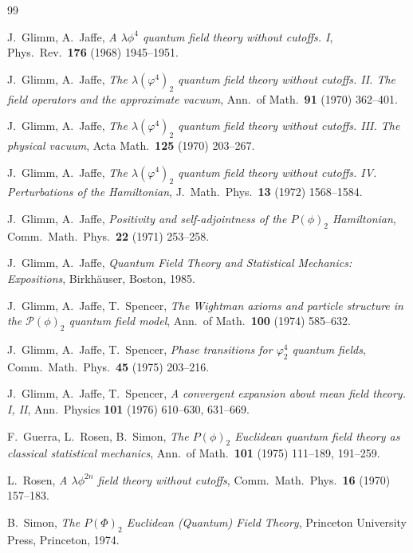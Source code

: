 \documentclass[11pt,a4paper]{article}
\theoremstyle{plain}
\theoremstyle{definition}
\theoremstyle{plain}
\theoremstyle{definition}
\begin{document}
\begin{thebibliography}{99}

 J.~Glimm, A.~Jaffe,
\emph{A $\lambda\phi^4$ quantum field theory without cutoffs. I},
Phys.\ Rev.\ \textbf{176} (1968) 1945--1951.

 J.~Glimm, A.~Jaffe,
\emph{The $\lambda(\varphi^4)_2$ quantum field theory without cutoffs. II. The field
operators and the approximate vacuum},
Ann.\ of Math.\ \textbf{91} (1970) 362--401.

 J.~Glimm, A.~Jaffe,
\emph{The $\lambda(\varphi^4)_2$ quantum field theory without cutoffs. III. The physical
vacuum},
Acta Math.\ \textbf{125} (1970) 203--267.

 J.~Glimm, A.~Jaffe,
\emph{The $\lambda(\varphi^4)_2$ quantum field theory without cutoffs. IV. Perturbations of
the Hamiltonian},
J.\ Math.\ Phys.\ \textbf{13} (1972) 1568--1584.

 J.~Glimm, A.~Jaffe,
\emph{Positivity and self-adjointness of the $P(\phi)_2$ Hamiltonian},
Comm.\ Math.\ Phys.\ \textbf{22} (1971) 253--258.

 J.~Glimm, A.~Jaffe,
\emph{Quantum Field Theory and Statistical Mechanics: Expositions},
Birkh\"auser, Boston, 1985.

 J.~Glimm, A.~Jaffe, T.~Spencer,
\emph{The Wightman axioms and particle structure in the $\mathscr P(\phi)_2$ quantum field
model},
Ann.\ of Math.\ \textbf{100} (1974) 585--632.

 J.~Glimm, A.~Jaffe, T.~Spencer,
\emph{Phase transitions for $\varphi^4_2$ quantum fields},
Comm.\ Math.\ Phys.\ \textbf{45} (1975) 203--216.

 J.~Glimm, A.~Jaffe, T.~Spencer,
\emph{A convergent expansion about mean field theory. I, II},
Ann.\ Physics \textbf{101} (1976) 610--630, 631--669.

 F.~Guerra, L.~Rosen, B.~Simon,
\emph{The $P(\phi)_2$ Euclidean quantum field theory as classical statistical mechanics},
Ann.\ of Math.\ \textbf{101} (1975) 111--189, 191--259.

 L.~Rosen,
\emph{A $\lambda\phi^{2n}$ field theory without cutoffs},
Comm.\ Math.\ Phys.\ \textbf{16} (1970) 157--183.

 B.~Simon,
\emph{The $P(\Phi)_2$ Euclidean (Quantum) Field Theory},
Princeton University Press, Princeton, 1974.


\end{thebibliography}
\end{document}
